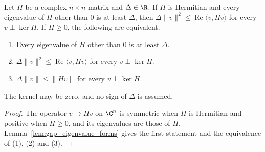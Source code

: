 \begin{theorem}
    \label{thm:hamiltonians_kernel_spectrum}
    \leanok
    Let $H$ be a complex $n\times n$ matrix and $\Delta\in\R$. If $H$ is Hermitian
    and every eigenvalue of $H$ other than $0$ is at least $\Delta$, then
    $\Delta\lVert v\rVert^2\le\operatorname{Re}\langle v,Hv\rangle$ for every
    $v\perp\ker H$. If $H\ge0$, the following are equivalent.
    \begin{enumerate}
        \item Every eigenvalue of $H$ other than $0$ is at least $\Delta$.
        \item $\Delta\lVert v\rVert^2\le\operatorname{Re}\langle v,Hv\rangle$ for
              every $v\perp\ker H$.
        \item $\Delta\lVert v\rVert\le\lVert Hv\rVert$ for every $v\perp\ker H$.
    \end{enumerate}
    The kernel may be zero, and no sign of $\Delta$ is assumed.
\end{theorem}
\begin{proof}\leanok
    The operator $v\mapsto Hv$ on $\C^n$ is symmetric when $H$ is Hermitian and positive
    when $H\ge0$, and its eigenvalues are those of $H$. Lemma~\ref{lem:gap_eigenvalue_forms}
    gives the first statement and the equivalence of (1), (2) and (3).
\end{proof}

